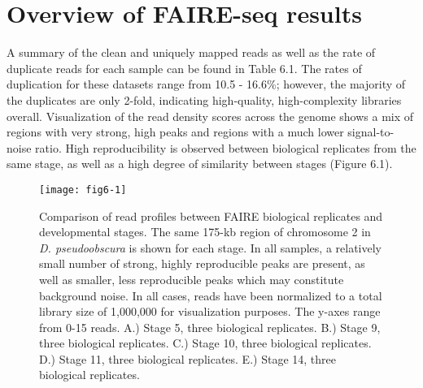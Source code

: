 \section{Overview of FAIRE-seq results}
A summary of the clean and uniquely mapped reads as well as the rate of duplicate reads for each sample can be found in Table 6.1. The rates of duplication for these datasets range from 10.5 - 16.6\%; however, the majority of the duplicates are only 2-fold, indicating high-quality, high-complexity libraries overall. Visualization of the read density scores across the genome shows a mix of regions with very strong, high peaks and regions with a much lower signal-to-noise ratio. High reproducibility is observed between biological replicates from the same stage, as well as a high degree of similarity between stages (Figure 6.1).\\

\begin{figure}
\centering
\texttt{[image: fig6-1]}
\caption{Comparison of read profiles between FAIRE biological replicates and developmental stages. The same 175-kb region of chromosome 2 in \emph{D. pseudoobscura} is shown for each stage. In all samples, a relatively small number of strong, highly reproducible peaks are present, as well as smaller, less reproducible peaks which may constitute background noise. In all cases, reads have been normalized to a total library size of 1,000,000 for visualization purposes. The y-axes range from 0-15 reads. A.) Stage 5, three biological replicates. B.) Stage 9, three biological replicates. C.) Stage 10, three biological replicates. D.) Stage 11, three biological replicates. E.) Stage 14, three biological replicates.}
\label{Figure 6.1}
\end{figure}


